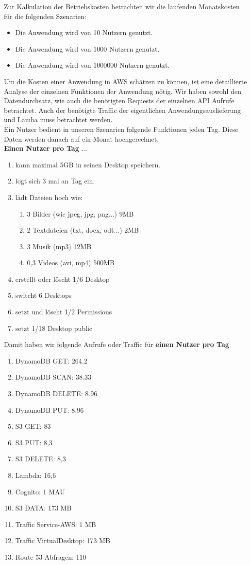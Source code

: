 \documentclass[a4paper, 12pt]{scrreprt}
\renewcommand\_{\textunderscore\allowbreak}
\begin{document}
Zur Kalkulation der Betriebskosten betrachten wir die laufenden Monatskosten für die folgenden Szenarien:\\
\begin{itemize}
\item Die Anwendung wird von 10 Nutzern genutzt.
\item Die Anwendung wird von 1000 Nutzern genutzt.
\item Die Anwendung wird von 1000000 Nutzern genutzt.
\end{itemize}

Um die Kosten einer Anwendung in AWS schätzen zu können, ist eine detaillierte Analyse der einzelnen Funktionen der Anwendung nötig. Wir haben sowohl den Datendurchsatz, wie auch die benötigten Requests der einzelnen API Aufrufe betrachtet. Auch der benötigte Traffic der eigentlichen Anwendungsauslieferung und Lamba muss betrachtet werden.\\ 
Ein Nutzer bedient in unseren Szenarien folgende Funktionen jeden Tag. Diese Daten werden danach auf ein Monat hochgerechnet. \\
\textbf{Einen Nutzer pro Tag} ...
\begin{enumerate}
\item kann maximal 5GB in seinen Desktop speichern.
\item logt sich 3 mal an Tag ein.
\item lädt Dateien hoch wie:
\begin{enumerate}
\item 3 Bilder (wie jpeg, jpg, png...) 9MB
\item 2 Textdateien (txt, docx, odt...) 2MB
\item 3 Musik (mp3) 12MB
\item 0,3 Videos (avi, mp4) 500MB
\end{enumerate}
\item erstellt oder löscht 1/6 Desktop
\item switcht 6 Desktops
\item setzt und löscht 1/2 Permissions
\item setzt 1/18 Desktop public
\end{enumerate}
Damit haben wir folgende Aufrufe oder Traffic für \textbf{einen Nutzer pro Tag}
\begin{enumerate}
\item DynamoDB GET: 264.2
\item DynamoDB SCAN: 38.33
\item DynamoDB DELETE: 8.96
\item DynamoDB PUT: 8.96
\item S3 GET: 83
\item S3 PUT: 8,3
\item S3 DELETE: 8,3
\item Lambda: 16,6
\item Cognito: 1 MAU
\item S3 DATA: 173 MB
\item Traffic Service-AWS: 1 MB
\item Traffic VirtualDesktop: 173 MB
\item Route 53 Abfragen: 110
\end{enumerate}
\end{document}
